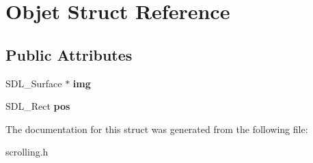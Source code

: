 \hypertarget{structObjet}{}\section{Objet Struct Reference}
\label{structObjet}
\subsection*{Public Attributes}
\begin{DoxyCompactItemize}
\item 
\mbox{\label{structObjet_a0dac95199f82a456854968bfe257a14e}} 
S\+D\+L\+\_\+\+Surface $\ast$ {\bfseries img}
\item 
\mbox{\label{structObjet_aa96c8e462a0637c98ab3c192e7f1806a}} 
S\+D\+L\+\_\+\+Rect {\bfseries pos}
\end{DoxyCompactItemize}


The documentation for this struct was generated from the following file\+:\begin{DoxyCompactItemize}
\item 
scrolling.\+h\end{DoxyCompactItemize}
